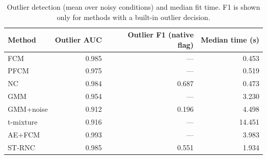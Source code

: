 \begin{table}[t]
\centering
\scriptsize
\setlength{\tabcolsep}{3pt}
\caption{Outlier detection (mean over noisy conditions) and median fit time. F1 is shown only for methods with a built-in outlier decision.}
\label{tab:outliers}
\begin{tabular}{lrrr}
\toprule
Method & Outlier AUC & Outlier F1 (native flag) & Median time (s) \\
\midrule
FCM & 0.985 & --- & 0.453 \\
PFCM & 0.975 & --- & 0.519 \\
NC & 0.984 & 0.687 & 0.473 \\
GMM & 0.954 & --- & 3.230 \\
GMM+noise & 0.912 & 0.196 & 4.498 \\
t-mixture & 0.916 & --- & 14.451 \\
AE+FCM & 0.993 & --- & 3.983 \\
ST-RNC & 0.985 & 0.551 & 1.934 \\
\bottomrule
\end{tabular}
\end{table}
